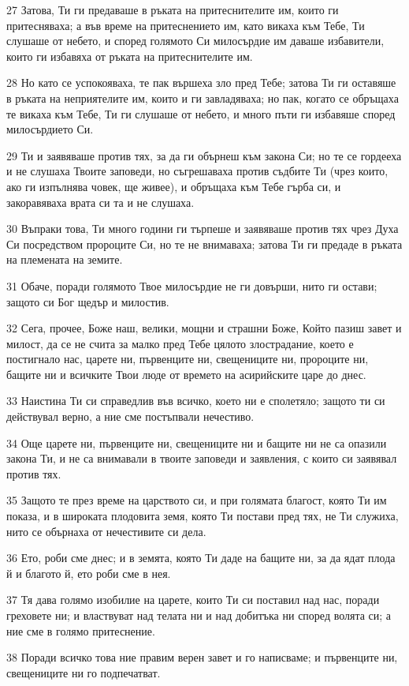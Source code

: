 \par 27 Затова, Ти ги предаваше в ръката на притеснителите им, които ги притесняваха; а във време на притеснението им, като викаха към Тебе, Ти слушаше от небето, и според голямото Си милосърдие им даваше избавители, които ги избавяха от ръката на притеснителите им.
\par 28 Но като се успокояваха, те пак вършеха зло пред Тебе; затова Ти ги оставяше в ръката на неприятелите им, които и ги завладяваха; но пак, когато се обръщаха те викаха към Тебе, Ти ги слушаше от небето, и много пъти ги избавяше според милосърдието Си.
\par 29 Ти и заявяваше против тях, за да ги обърнеш към закона Си; но те се гордееха и не слушаха Твоите заповеди, но съгрешаваха против съдбите Ти (чрез които, ако ги изпълнява човек, ще живее), и обръщаха към Тебе гърба си, и закоравяваха врата си та и не слушаха.
\par 30 Въпраки това, Ти много години ги търпеше и заявяваше против тях чрез Духа Си посредством пророците Си, но те не внимаваха; затова Ти ги предаде в ръката на племената на земите.
\par 31 Обаче, поради голямото Твое милосърдие не ги довърши, нито ги остави; защото си Бог щедър и милостив.
\par 32 Сега, прочее, Боже наш, велики, мощни и страшни Боже, Който пазиш завет и милост, да се не счита за малко пред Тебе цялото злострадание, което е постигнало нас, царете ни, първенците ни, свещениците ни, пророците ни, бащите ни и всичките Твои люде от времето на асирийските царе до днес.
\par 33 Наистина Ти си справедлив във всичко, което ни е сполетяло; защото ти си действувал верно, а ние сме постъпвали нечестиво.
\par 34 Още царете ни, първенците ни, свещениците ни и бащите ни не са опазили закона Ти, и не са внимавали в твоите заповеди и заявления, с които си заявявал против тях.
\par 35 Защото те през време на царството си, и при голямата благост, която Ти им показа, и в широката плодовита земя, която Ти постави пред тях, не Ти служиха, нито се обърнаха от нечестивите си дела.
\par 36 Ето, роби сме днес; и в земята, която Ти даде на бащите ни, за да ядат плода й и благото й, ето роби сме в нея.
\par 37 Тя дава голямо изобилие на царете, които Ти си поставил над нас, поради греховете ни; и властвуват над телата ни и над добитъка ни според волята си; а ние сме в голямо притеснение.
\par 38 Поради всичко това ние правим верен завет и го написваме; и първенците ни, свещениците ни го подпечатват.

